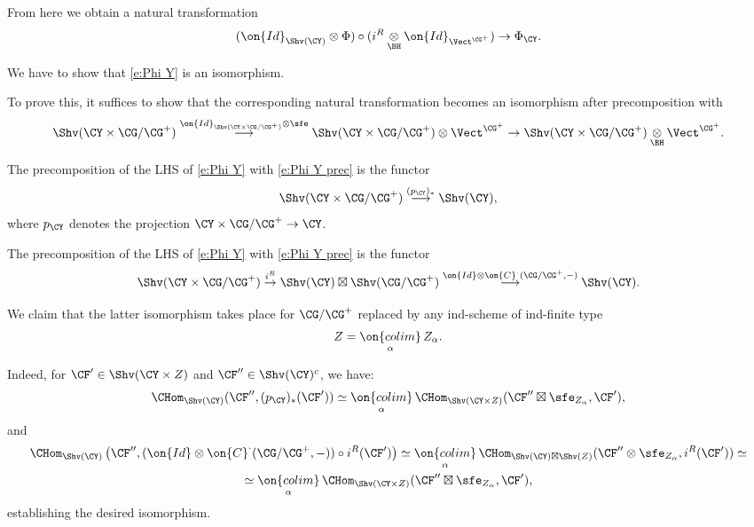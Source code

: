 \documentclass[9pt]{amsart}
\theoremstyle{definition}
\theoremstyle{remark}
\numberwithin{equation}{section}
\begin{document}
From here we obtain a natural transformation
\begin{equation} \label{e:Phi Y}
(\on{Id}_{\Shv(\CY)}\otimes \Phi) \circ (i^R\underset{\BH}\otimes \on{Id}_{\Vect^{\CG^+}})\to \Phi_\CY.
\end{equation}

We have to show that \eqref{e:Phi Y} is an isomorphism.

\sssec{}

To prove this, it suffices to show that the corresponding natural transformation becomes an isomorphism after precomposition with 
\begin{equation} \label{e:Phi Y prec}
\Shv(\CY\times \CG/\CG^+) \overset{\on{Id}_{\Shv(\CY\times \CG/\CG^+) }\otimes \sfe}\longrightarrow 
\Shv(\CY\times \CG/\CG^+) \otimes \Vect^{\CG^+}\to \Shv(\CY\times \CG/\CG^+) \underset{\BH}\otimes \Vect^{\CG^+}.
\end{equation}

The precomposition of the LHS of \eqref{e:Phi Y} with \eqref{e:Phi Y prec} is the functor 
\begin{equation} \label{e:Phi Y prec 1}
\Shv(\CY\times \CG/\CG^+) \overset{(p_\CY)_*}\longrightarrow \Shv(\CY),
\end{equation}
where $p_\CY$ denotes the projection $\CY\times \CG/\CG^+\to \CY$.

\medskip

The precomposition of the LHS of \eqref{e:Phi Y} with \eqref{e:Phi Y prec} is the functor
\begin{equation} \label{e:Phi Y prec 2}
\Shv(\CY\times \CG/\CG^+)  \overset{i^R}\to \Shv(\CY)\boxtimes \Shv(\CG/\CG^+) \overset{\on{Id}\otimes \on{C}^\cdot(\CG/\CG^+,-)}
\longrightarrow \Shv(\CY).
\end{equation}

\sssec{}

We claim that the latter isomorphism takes place for $\CG/\CG^+$ replaced by any 
ind-scheme of ind-finite type
$$Z=\underset{\alpha}{\on{colim}}\, Z_\alpha.$$

\medskip

Indeed, for $\CF'\in \Shv(\CY\times Z)$ and $\CF''\in \Shv(\CY)^c$, we have:
$$\CHom_{\Shv(\CY)}(\CF'',(p_\CY)_*(\CF'))\simeq 
\underset{\alpha}{\on{colim}}\, \CHom_{\Shv(\CY\times Z)}(\CF''\boxtimes \sfe_{Z_\alpha},\CF'),$$
and
\begin{multline*}
\CHom_{\Shv(\CY)}\left(\CF'',(\on{Id}\otimes \on{C}^\cdot(\CG/\CG^+,-))\circ i^R(\CF')\right)\simeq
\underset{\alpha}{\on{colim}}\,  \CHom_{\Shv(\CY)\boxtimes \Shv(Z)}(\CF''\otimes \sfe_{Z_\alpha},i^R(\CF'))\simeq \\
\simeq \underset{\alpha}{\on{colim}}\, \CHom_{\Shv(\CY\times Z)}(\CF''\boxtimes \sfe_{Z_\alpha},\CF'),
\end{multline*}
establishing the desired isomorphism. 
\end{document}
